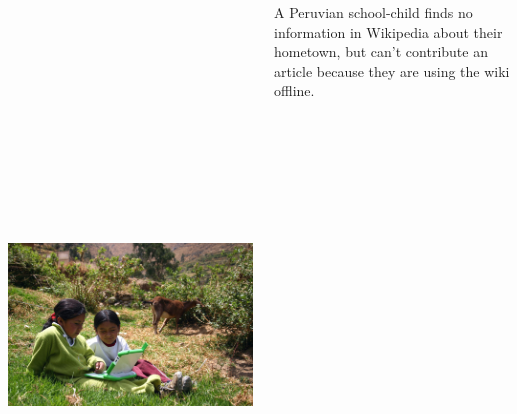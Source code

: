 \documentclass[25pt, a0paper, landscape, cmyk]{tikzposter}
\begin{document}
\begin{columns}
{    \begin{tikzfigure}
      \includegraphics[height=17cm]{Bucolico-full.jpg}
    \end{tikzfigure}

    A Peruvian school-child finds no information in Wikipedia about
    their hometown, but can't contribute an article because they are
    using the wiki offline.

  }
\end{columns}
\end{document}
